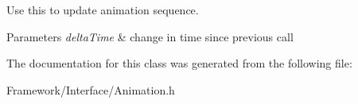 Use this to update animation sequence. 
\begin{DoxyParams}{Parameters}
{\em delta\+Time} & change in time since previous call \\
\hline
\end{DoxyParams}


The documentation for this class was generated from the following file\+:\begin{DoxyCompactItemize}
\item 
Framework/\+Interface/Animation.\+h\end{DoxyCompactItemize}
